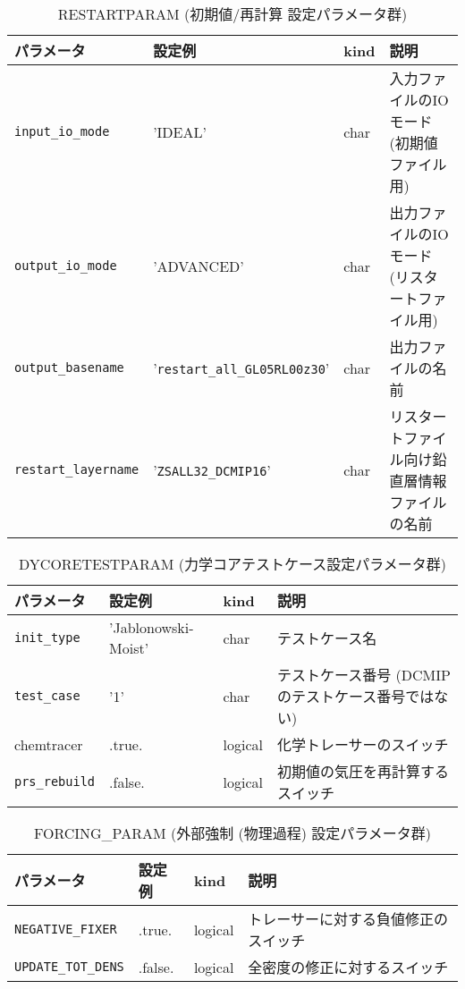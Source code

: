 \begin{table}[htb]
\begin{center}
\caption{RESTARTPARAM (初期値/再計算 設定パラメータ群)}
\begin{tabularx}{150mm}{|l|l|l|X|} \hline
 \rowcolor[gray]{0.9} パラメータ & 設定例 & kind & 説明          \\ \hline
 \verb|input_io_mode|     & 'IDEAL'                   & char & 入力ファイルのIOモード (初期値ファイル用) \\ \hline
 \verb|output_io_mode|    & 'ADVANCED'                & char & 出力ファイルのIOモード (リスタートファイル用) \\ \hline
 \verb|output_basename|   & '\verb|restart_all_GL05RL00z30|' & char & 出力ファイルの名前 \\ \hline
 \verb|restart_layername| & '\verb|ZSALL32_DCMIP16|'         & char & リスタートファイル向け鉛直層情報ファイルの名前 \\ \hline
\end{tabularx}
\end{center}
\end{table}

\begin{table}[htb]
\begin{center}
\caption{DYCORETESTPARAM (力学コアテストケース設定パラメータ群)}
\begin{tabularx}{150mm}{|l|l|l|X|} \hline
 \rowcolor[gray]{0.9} パラメータ & 設定例 & kind & 説明          \\ \hline
 \verb|init_type|    & 'Jablonowski-Moist' & char & テストケース名 \\ \hline
 \verb|test_case|    & '1'     & char & テストケース番号 (DCMIPのテストケース番号ではない) \\ \hline
 chemtracer   & .true.  & logical & 化学トレーサーのスイッチ \\ \hline
 \verb|prs_rebuild|  & .false. & logical & 初期値の気圧を再計算するスイッチ \\ \hline
\end{tabularx}
\end{center}
\end{table}

\begin{table}[htb]
\begin{center}
\caption{FORCING\_PARAM (外部強制 (物理過程) 設定パラメータ群)}
\begin{tabularx}{150mm}{|l|l|l|X|} \hline
 \rowcolor[gray]{0.9} パラメータ & 設定例 & kind & 説明          \\ \hline
 \verb|NEGATIVE_FIXER|  & .true.  & logical & トレーサーに対する負値修正のスイッチ \\ \hline
 \verb|UPDATE_TOT_DENS| & .false. & logical & 全密度の修正に対するスイッチ \\ \hline
\end{tabularx}
\end{center}
\end{table}

